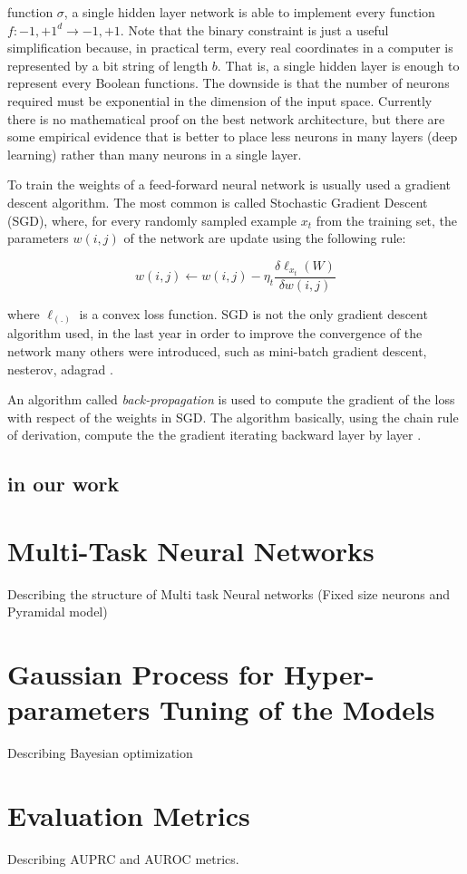 function $\sigma$, a single hidden layer network is able to
implement every function $f: {-1, +1}^d \to {-1, +1}$. Note that the
binary constraint is just a useful simplification because, in
practical term, every real coordinates in a computer is represented
by a bit string of length $b$. That is, a single hidden layer is
enough to represent every Boolean functions. The downside is that
the number of neurons required must be exponential in the dimension
of the input space. Currently there is no mathematical proof on the
best network architecture, but there are some empirical evidence
that is better to place less neurons in many layers (deep learning)
rather than many neurons in a single layer. %

To train the weights of a feed-forward neural network is usually
used a gradient descent algorithm. The most common is called
Stochastic Gradient Descent (SGD), where, for every randomly sampled
example $x_t$ from the training set, the parameters $w(i, j)$ of the
network are update using the following rule:

\[ w(i, j) \leftarrow w(i, j) -  \eta_t \frac{\delta\ell_{x_t}(W)}{\delta w(i, j )}\]

where $\ell_(.)$ is a convex loss function. SGD is not the only
gradient descent algorithm used, in the last year in order to
improve the convergence of the network many others were introduced,
such as mini-batch gradient descent, nesterov, adagrad
\cite{RuderGDOpt}. 

An algorithm called \emph{back-propagation} is used to compute the
gradient of the loss with respect of the weights in SGD. The
algorithm basically, using the chain rule of derivation, compute the
the gradient iterating backward layer by layer
\cite{HintonBackProp}.

\subsection{in our work}





\section{Multi-Task Neural Networks}\label{MTLsection}
Describing the structure of Multi task Neural networks (Fixed size neurons and Pyramidal model)
\section{Gaussian Process for Hyper-parameters Tuning of the Models}
Describing Bayesian optimization 
\section{Evaluation Metrics}
Describing AUPRC and AUROC metrics. 